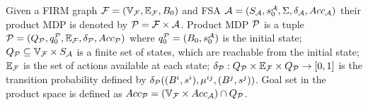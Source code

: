 \documentclass[conference]{IEEEtran}
\begin{document}
\begin{definition}
\label{def:pa}
Given a FIRM graph $\mathcal{F} = (\mathbb{V}_{\mathcal{F}}, \mathbb{E}_{\mathcal{F}}, B_0)$ and FSA $\mathcal{A} = (S_{\mathcal{A}}, s_0^{\mathcal{A}}, \Sigma, \delta_{\mathcal{A}}, Acc_{\mathcal{A}})$ their product MDP is denoted by  $\mathcal{P} = \mathcal{F} \times \mathcal{A}$. Product MDP $\mathcal{P}$
is a tuple $\mathcal{P} = (Q_{\mathcal{P}}, q_0^{\mathcal{P}}, \mathbb{E}_{\mathcal{F}}, \delta_{\mathcal{P}}, Acc_{\mathcal{P}})$ where
$q_0^{\mathcal{P}} = (B_0 , s_0^{\mathcal{A}})$ is the initial state;
$Q_{\mathcal{P}} \subseteq \mathbb{V}_{\mathcal{F}} \times S_{\mathcal{A}} $ is a finite set of states, which are reachable from the initial state; %
$\mathbb{E}_{\mathcal{F}}$ is the set of actions available at each state;
$\delta_{\mathcal{P}} : Q_{\mathcal{P}} \times \mathbb{E}_{\mathcal{F}} \times Q_{\mathcal{P}} \rightarrow [0, 1]$ is the transition probability
defined by $\delta_{\mathcal{P}}((B^i, s^i), \mu^{ij}, (B^j, s^j))$. Goal set in the product space is defined as $Acc_{\mathcal{P}} =  (\mathbb{V}_{\mathcal{F}} \times Acc_{\mathcal{A}}) \cap Q_{\mathcal{P}}$.


\end{definition}
\end{document}
